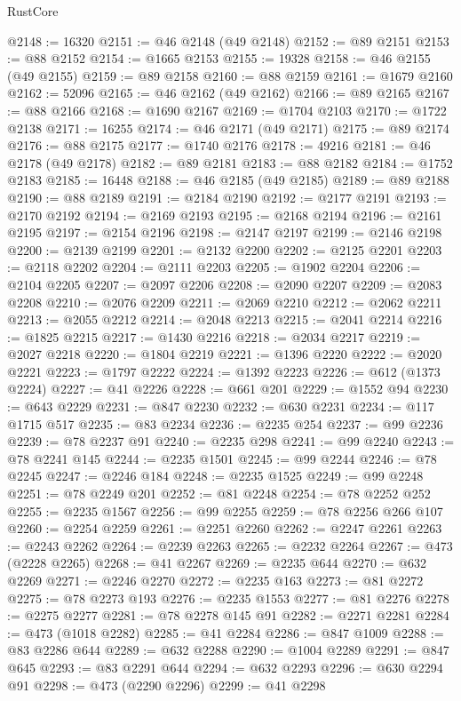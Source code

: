 \begin{lexlean}{RustCore}
\begin{coremodule}
@2148 := 16320
@2151 := @46 @2148 (@49 @2148)
@2152 := @89 @2151
@2153 := @88 @2152
@2154 := @1665 @2153
@2155 := 19328
@2158 := @46 @2155 (@49 @2155)
@2159 := @89 @2158
@2160 := @88 @2159
@2161 := @1679 @2160
@2162 := 52096
@2165 := @46 @2162 (@49 @2162)
@2166 := @89 @2165
@2167 := @88 @2166
@2168 := @1690 @2167
@2169 := @1704 @2103
@2170 := @1722 @2138
@2171 := 16255
@2174 := @46 @2171 (@49 @2171)
@2175 := @89 @2174
@2176 := @88 @2175
@2177 := @1740 @2176
@2178 := 49216
@2181 := @46 @2178 (@49 @2178)
@2182 := @89 @2181
@2183 := @88 @2182
@2184 := @1752 @2183
@2185 := 16448
@2188 := @46 @2185 (@49 @2185)
@2189 := @89 @2188
@2190 := @88 @2189
@2191 := @2184 @2190
@2192 := @2177 @2191
@2193 := @2170 @2192
@2194 := @2169 @2193
@2195 := @2168 @2194
@2196 := @2161 @2195
@2197 := @2154 @2196
@2198 := @2147 @2197
@2199 := @2146 @2198
@2200 := @2139 @2199
@2201 := @2132 @2200
@2202 := @2125 @2201
@2203 := @2118 @2202
@2204 := @2111 @2203
@2205 := @1902 @2204
@2206 := @2104 @2205
@2207 := @2097 @2206
@2208 := @2090 @2207
@2209 := @2083 @2208
@2210 := @2076 @2209
@2211 := @2069 @2210
@2212 := @2062 @2211
@2213 := @2055 @2212
@2214 := @2048 @2213
@2215 := @2041 @2214
@2216 := @1825 @2215
@2217 := @1430 @2216
@2218 := @2034 @2217
@2219 := @2027 @2218
@2220 := @1804 @2219
@2221 := @1396 @2220
@2222 := @2020 @2221
@2223 := @1797 @2222
@2224 := @1392 @2223
@2226 := @612 (@1373 @2224)
@2227 := @41 @2226
@2228 := @661 @201
@2229 := @1552 @94
@2230 := @643 @2229
@2231 := @847 @2230
@2232 := @630 @2231
@2234 := @117 @1715 @517
@2235 := @83 @2234
@2236 := @2235 @254
@2237 := @99 @2236
@2239 := @78 @2237 @91
@2240 := @2235 @298
@2241 := @99 @2240
@2243 := @78 @2241 @145
@2244 := @2235 @1501
@2245 := @99 @2244
@2246 := @78 @2245
@2247 := @2246 @184
@2248 := @2235 @1525
@2249 := @99 @2248
@2251 := @78 @2249 @201
@2252 := @81 @2248
@2254 := @78 @2252 @252
@2255 := @2235 @1567
@2256 := @99 @2255
@2259 := @78 @2256 @266 @107
@2260 := @2254 @2259
@2261 := @2251 @2260
@2262 := @2247 @2261
@2263 := @2243 @2262
@2264 := @2239 @2263
@2265 := @2232 @2264
@2267 := @473 (@2228 @2265)
@2268 := @41 @2267
@2269 := @2235 @644
@2270 := @632 @2269
@2271 := @2246 @2270
@2272 := @2235 @163
@2273 := @81 @2272
@2275 := @78 @2273 @193
@2276 := @2235 @1553
@2277 := @81 @2276
@2278 := @2275 @2277
@2281 := @78 @2278 @145 @91
@2282 := @2271 @2281
@2284 := @473 (@1018 @2282)
@2285 := @41 @2284
@2286 := @847 @1009
@2288 := @83 @2286 @644
@2289 := @632 @2288
@2290 := @1004 @2289
@2291 := @847 @645
@2293 := @83 @2291 @644
@2294 := @632 @2293
@2296 := @630 @2294 @91
@2298 := @473 (@2290 @2296)
@2299 := @41 @2298

\end{coremodule}
\end{lexlean}
